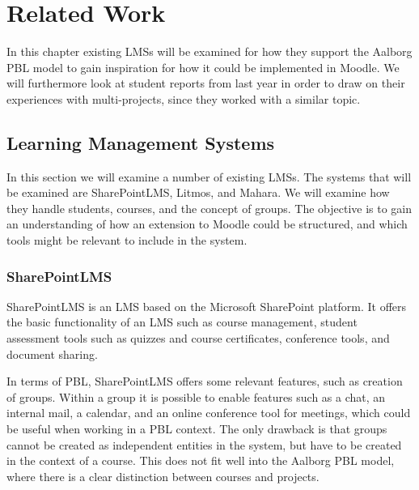 \chapter{Related Work}
\label{chap:relatedwork}
In this chapter existing LMSs will be examined for how they support the Aalborg PBL model to gain inspiration for how it could be implemented in Moodle.
We will furthermore look at student reports from last year in order to draw on their experiences with multi-projects, since they worked with a similar topic.

\section{Learning Management Systems}\label{sec:LMS}
In this section we will examine a number of existing LMSs.
The systems that will be examined are SharePointLMS, Litmos, and Mahara.
We will examine how they handle students, courses, and the concept of groups.
The objective is to gain an understanding of how an extension to Moodle could be structured, and which tools might be relevant to include in the system.

\subsection{SharePointLMS}
SharePointLMS \citep{sharepointlms} is an LMS based on the Microsoft SharePoint platform. 
It offers the basic functionality of an LMS such as course management, student assessment tools such as quizzes and course certificates, conference tools, and document sharing.

In terms of PBL, SharePointLMS offers some relevant features, such as creation of groups.
Within a group it is possible to enable features such as a chat, an internal mail, a calendar, and an online conference tool for meetings, which could be useful when working in a PBL context.
The only drawback is that groups cannot be created as independent entities in the system, but have to be created in the context of a course.
This does not fit well into the Aalborg PBL model, where there is a clear distinction between courses and projects.

